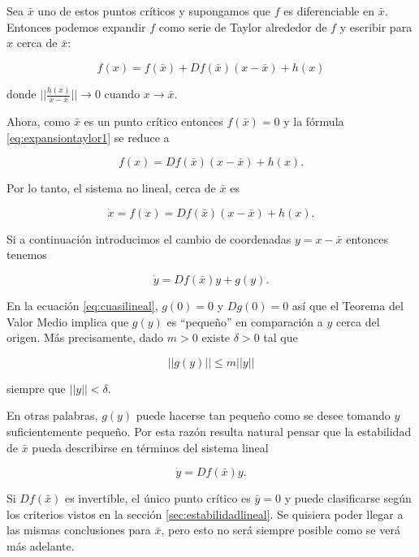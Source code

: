 \documentclass[11pt]{book}
\theoremstyle{definition}
\numberwithin{definition}{section}
\theoremstyle{theorem}
\numberwithin{theorem}{section}
\numberwithin{lemma}{section}
\numberwithin{corollary}{section}
\theoremstyle{plain}
\numberwithin{example}{section}
\begin{document}
Sea $\bar{x}$ uno de estos puntos críticos y supongamos que $f$ es diferenciable en $\bar{x}$. Entonces podemos expandir $f$ como serie de Taylor alrededor de $f$ y escribir para $x$ cerca de $\bar{x}$:

\begin{equation} \label{eq:expansiontaylor1}
	f(x) = f(\bar{x}) + Df(\bar{x})(x - \bar{x}) + h(x)
\end{equation}

donde $|| \frac{h(x)}{x - \bar{x}}|| \to 0$ cuando $x \to \bar{x}$.

Ahora, como $\bar{x}$ es un punto crítico entonces $f(\bar{x}) = 0$ y la fórmula \ref{eq:expansiontaylor1} se reduce a 

\begin{equation}
	f(x) = Df(\bar{x})(x - \bar{x}) + h(x).
\end{equation}

Por lo tanto, el sistema no lineal, cerca de $\bar{x}$ es

$$ \dot{x} = f(x) = Df(\bar{x})(x - \bar{x}) + h(x).$$

Si a continuación introducimos el cambio de coordenadas $y = x - \bar{x}$ entonces tenemos 

\begin{equation} \label{eq:cuasilineal}
	\dot{y} = Df(\bar{x})y + g(y).
\end{equation}

En la ecuación \ref{eq:cuasilineal}, $g(0) = 0$ y $Dg(0) = 0$ así que el Teorema del Valor Medio implica que $g(y)$ es ``pequeño'' en comparación a $y$ cerca del origen. Más precisamente, dado $m > 0$ existe $\delta > 0$ tal que 

$$ ||g(y)|| \leq m||y||$$

siempre que $||y|| < \delta$.

En otras palabras, $g(y)$ puede hacerse tan pequeño como se desee tomando $y$ suficientemente pequeño. Por esta razón resulta natural pensar que la estabilidad de $\bar{x}$ pueda describirse en términos del sistema lineal

\begin{equation} \label{eq:linealizacion}
	\dot{y} = Df(\bar{x})y.
\end{equation}

Si $Df(\bar{x})$ es invertible, el único punto crítico es $\bar{y} = 0$ y puede clasificarse según los criterios vistos en la sección \ref{sec:estabilidadlineal}.
Se quisiera poder llegar a las mismas conclusiones para $\bar{x}$, pero esto no será siempre posible como se verá más adelante.
\end{document}
